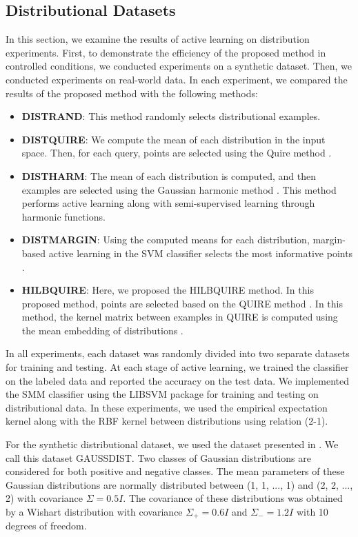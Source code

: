 \documentclass[12pt]{article}
\begin{document}
	\subsection{Distributional Datasets}
	In this section, we examine the results of active learning on distribution experiments. First, to demonstrate the efficiency of the proposed method in controlled conditions, we conducted experiments on a synthetic dataset. Then, we conducted experiments on real-world data. In each experiment, we compared the results of the proposed method with the following methods:
	\begin{itemize}
		\item \textbf{DISTRAND}: This method randomly selects distributional examples.
		\item \textbf{DISTQUIRE}: We compute the mean of each distribution in the input space. Then, for each query, points are selected using the Quire method \cite{huang2014active}.
		\item \textbf{DISTHARM}: The mean of each distribution is computed, and then examples are selected using the Gaussian harmonic method \cite{zhu2003semi}. This method performs active learning along with semi-supervised learning through harmonic functions.
		\item \textbf{DISTMARGIN}: Using the computed means for each distribution, margin-based active learning in the SVM classifier selects the most informative points \cite{scheffer2001active}.
		\item \textbf{HILBQUIRE}: Here, we proposed the HILBQUIRE method. In this proposed method, points are selected based on the QUIRE method \cite{huang2014active}. In this method, the kernel matrix between examples in QUIRE is computed using the mean embedding of distributions \cite{muandet2012domain}.
	\end{itemize}
	
	In all experiments, each dataset was randomly divided into two separate datasets for training and testing. At each stage of active learning, we trained the classifier on the labeled data and reported the accuracy on the test data. We implemented the SMM classifier \cite{sriperumbudur2009kernel} using the LIBSVM package \cite{chang2011libsvm} for training and testing on distributional data. In these experiments, we used the empirical expectation kernel along with the RBF kernel between distributions using relation (2-1).
	
	For the synthetic distributional dataset, we used the dataset presented in \cite{sriperumbudur2009kernel}. We call this dataset GAUSSDIST. Two classes of Gaussian distributions are considered for both positive and negative classes. The mean parameters of these Gaussian distributions are normally distributed between (1, 1, ..., 1) and (2, 2, ..., 2) with covariance $\Sigma = 0.5 I$. The covariance of these distributions was obtained by a Wishart distribution with covariance $\Sigma_+ = 0.6 I$ and $\Sigma_- = 1.2 I$ with 10 degrees of freedom.
	
\end{document}
